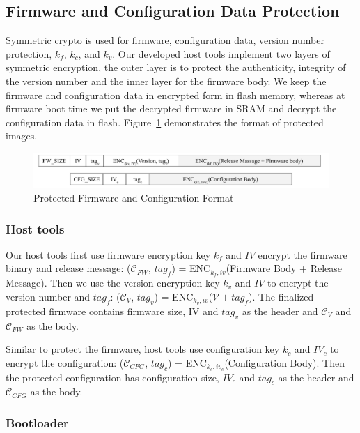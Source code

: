\documentclass[11pt,oneside,onecolumn,letterpaper]{article}
\begin{document}
\subsection{Firmware and Configuration Data Protection}
Symmetric crypto is used for firmware, configuration data, version number protection, $k_f$, $k_c$, and $k_v$.
Our developed host tools implement two layers of symmetric encryption, the outer layer is to protect the authenticity, integrity of the version number and the inner layer for the firmware body.
We keep the firmware and configuration data in encrypted form in flash memory, whereas at firmware boot time we put the decrypted firmware in SRAM and decrypt the configuration data in flash.
Figure~\ref{fig:frmt} demonstrates the format of protected images.

\begin{figure}[!htbp]
	\begin{centering}
		\includegraphics[width = .80\textwidth]{pic/FW_CFG_FORMAT.pdf}
		\caption{Protected Firmware and Configuration Format}
		\label{fig:frmt}
	\end{centering}
\end{figure}

\subsubsection{Host tools}
Our host tools first use firmware encryption key $k_f$ and $IV$ encrypt the firmware binary and release message: ($\mathcal{C}_{FW}$, $tag_f$) = ENC$_{k_f, iv}$(Firmware Body + Release Message).
Then we use the version encryption key $k_v$ and $IV$ to encrypt the version number and $tag_f$: ($\mathcal{C}_V$, $tag_v$) = ENC$_{k_v, iv}$($\mathcal{V} + tag_f$).
The finalized protected firmware contains firmware size, IV and $tag_v$ as the header and $\mathcal{C}_V$ and $\mathcal{C}_{FW}$ as the body.

Similar to protect the firmware, host tools use configuration key $k_c$ and $IV_c$ to encrypt the configuration: ($\mathcal{C}_{CFG}$, $tag_c$) = ENC$_{k_c, iv_c}$(Configuration Body).
Then the protected configuration has configuration size, $IV_c$ and $tag_c$ as the header and $\mathcal{C}_{CFG}$ as the body.

\subsubsection{Bootloader}
\end{document}
